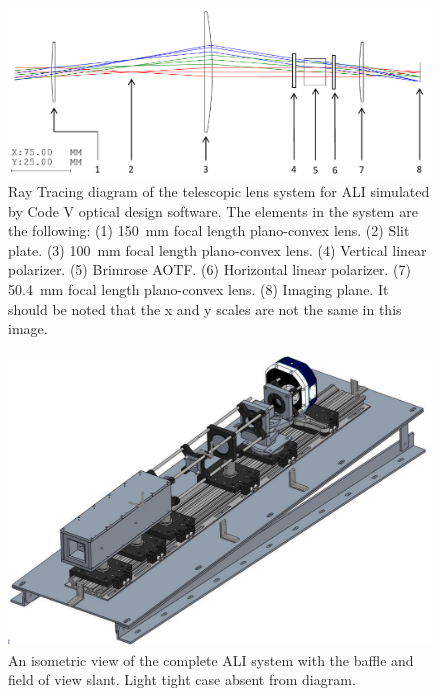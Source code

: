 \documentclass[12pt]{article}
\begin{document}
\newpage

\begin{figure}
    \includegraphics[width=1.0\textwidth]{./Images/3-2-TelescopicRayTracing.pdf}
    \caption{Ray Tracing diagram of the telescopic lens system for ALI simulated by Code V optical design software. The elements in the system are the following: (1) 150~mm focal length plano-convex lens. (2) Slit plate. (3) 100~mm focal length plano-convex lens. (4) Vertical linear polarizer. (5) Brimrose AOTF. (6) Horizontal linear polarizer. (7) 50.4~mm focal length plano-convex lens. (8) Imaging plane. It should be noted that the x and y scales are not the same in this image.}
    \label{fig:3.2:telescopicRayTracing}
\end{figure}

\newpage

\begin{figure}[h!]
        \centering
        \includegraphics[width=1.0\textwidth]{./Images/3-3-AliCompleteDesign.pdf}
        \caption{An isometric view of the complete ALI system with the baffle and field of view slant. Light tight case absent from diagram.}
        \label{fig:3.3:aliSystemDiagram}
\end{figure}
\end{document}
